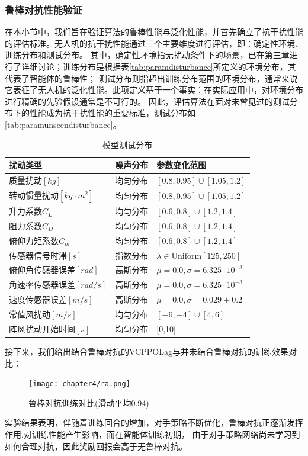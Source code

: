 \subsubsection{鲁棒对抗性能验证}
在本小节中，我们旨在验证算法的鲁棒性能与泛化性能，并首先确立了抗干扰性能的评估标准。无人机的抗干扰性能通过三个主要维度进行评估，即：确定性环境、训练分布和测试分布。
其中，确定性环境指无扰动条件下的场景，已在第三章进行了详细讨论；训练分布是根据表\autoref{tab:paramdisturbance}所定义的环境分布，其代表了智能体的鲁棒性；
测试分布则指超出训练分布范围的环境分布，通常来说它表征了无人机的泛化性能。此项定义基于一个事实：在实际应用中，对环境分布进行精确的先验假设通常是不可行的。
因此，评估算法在面对未曾见过的测试分布下的性能成为抗干扰性能的重要标准，测试分布如\autoref{tab:paramunseendisturbance}。
\begin{table}
    \centering
    \caption{模型测试分布}
    \label{tab:paramunseendisturbance}
    \begin{tabular*}{0.8\textwidth}{@{\extracolsep{\fill}}lll}
        \toprule
        扰动类型 & 噪声分布 & 参数变化范围 \\
        \midrule
        质量扰动\( \left [ kg \right ]  \) & 均匀分布 &  \( [0.8,0.95]\cup[1.05,1.2] \)\\
        转动惯量扰动\( \left [ kg \cdot m^{2} \right ]  \) & 均匀分布 & \(  [0.8,0.95]\cup[1.05,1.2]  \) \\
        升力系数\(C_{L}\) & 均匀分布 & \( [0.6,0.8]\cup[1.2,1.4]  \) \\
        阻力系数\(C_{D}\) & 均匀分布 & \( [0.6,0.8]\cup[1.2,1.4]  \) \\
        俯仰力矩系数\(C_{m} \) & 均匀分布 & \( [0.6,0.8]\cup[1.2,1.4]  \) \\
        传感器信号时滞\( \left [ s \right ]  \) & 指数分布 & \(\lambda\in  \text{Uniform}[ 125,250] \) \\
        俯仰角传感器误差\( \left [ rad \right ]  \) & 高斯分布 & \(\mu = 0.0 ,\sigma =  6.325 \cdot 10^{-3}\) \\
        角速率传感器误差\( \left [ rad/s \right ]  \) & 高斯分布 & \( \mu = 0.0 ,\sigma = 6.325 \cdot 10^{-3}\) \\
        速度传感器误差\( \left [ m/s \right ]  \) & 高斯分布 & \( \mu = 0.0 ,\sigma = 0.029 + 0.2 \) \\
        常值风扰动\( \left [ m/s \right ]  \) & 均匀分布 & \( [-6,-4]\cup[4,6] \)  \\
        阵风扰动开始时间\( \left [ s \right ]\) &均匀分布 & [0,10]\\
        \bottomrule
    \end{tabular*}
\end{table}
接下来，我们给出结合鲁棒对抗的VCPPOLag与并未结合鲁棒对抗的训练效果对比：
\begin{figure}[htbp]
    \centering
    \texttt{[image: chapter4/ra.png]}
    \caption{\label{fig:ra}鲁棒对抗训练对比(滑动平均0.94)}
\end{figure}
实验结果表明，伴随着训练回合的增加，对手策略不断优化，鲁棒对抗正逐渐发挥作用,对训练性能产生影响，而在智能体训练初期，
由于对手策略网络尚未学习到如何合理对抗，因此奖励回报会高于无鲁棒对抗。

